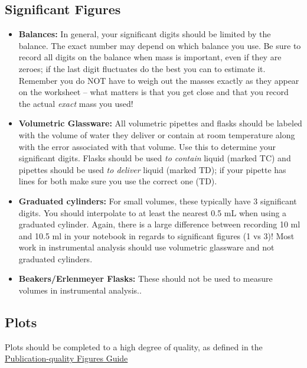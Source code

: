\documentclass[]{tufte-book}
\providecommand{\tightlist}{%
  \setlength{\itemsep}{0pt}\setlength{\parskip}{0pt}}
\begin{document}
\hypertarget{significant-figures}{%
\subsection*{Significant Figures}\label{significant-figures}}

\begin{itemize}
\tightlist
\item
  \textbf{Balances:} In general, your significant digits should be limited by the balance. The exact number may depend on which balance you use. Be sure to record all digits on the balance when mass is important, even if they are zeroes; if the last digit fluctuates do the best you can to estimate it. Remember you do NOT have to weigh out the masses exactly as they appear on the worksheet -- what matters is that you get close and that you record the actual \emph{exact} mass you used!
\item
  \textbf{Volumetric Glassware:} All volumetric pipettes and flasks should be labeled with the volume of water they deliver or contain at room temperature along with the error associated with that volume. Use this to determine your significant digits. Flasks should be used \emph{to contain} liquid (marked TC) and pipettes should be used \emph{to deliver} liquid (marked TD); if your pipette has lines for both make sure you use the correct one (TD).
\item
  \textbf{Graduated cylinders:} For small volumes, these typically have 3 significant digits. You should interpolate to at least the nearest 0.5 mL when using a graduated cylinder. Again, there is a large difference between recording 10 ml and 10.5 ml in your notebook in regards to significant figures (1 vs 3)! Most work in instrumental analysis should use volumetric glassware and not graduated cylinders.
\item
  \textbf{Beakers/Erlenmeyer Flasks:} These should not be used to measure volumes in instrumental analysis..
\end{itemize}

\hypertarget{plots}{%
\subsection*{Plots}\label{plots}}

Plots should be completed to a high degree of quality, as defined in the \href{\%7B\%7Bsite.baseurl\%7D\%7D/devel/chem370/writing/figures}{Publication-quality Figures Guide}
\end{document}
